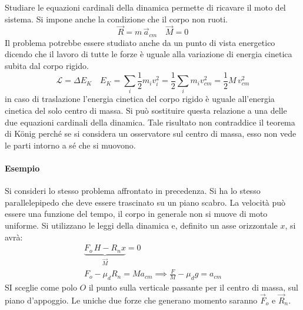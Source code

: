 \documentclass[10pt,a4paper]{book}
\begin{document}
\begin{figure}[htpb]
\end{figure}
\FloatBarrier
Studiare le equazioni cardinali della dinamica permette di ricavare il moto del sistema. Si impone anche la condizione che il corpo non ruoti.
\[
	\vec{R} = m\,\vec{a}_{cm} 	\quad \vec{M} = 0
\]
Il problema potrebbe essere studiato anche da un punto di vista energetico dicendo che il lavoro di tutte le forze è uguale alla variazione di energia cinetica subita dal corpo rigido.
\[
	\mathcal{L} = \Delta E_K \quad E_K = \sum_i \frac{1}{2}  m_i v_i^2  = \frac{1}{2} \sum_i m_i v_{cm}^2  = \frac{1}{2} M\,v_{cm}^2
\]
in caso di traslazione l'energia cinetica del corpo rigido è uguale all'energia cinetica del solo centro di massa. Si può sostituire questa relazione a una delle due equazioni cardinali della dinamica. Tale risultato non contraddice il teorema di K\"onig perché se si considera un osservatore sul centro di massa, esso non vede le parti intorno a sé che si muovono.

\paragraph{Esempio} Si consideri lo stesso problema affrontato in precedenza. Si ha lo stesso parallelepipedo che deve essere trascinato su un piano scabro. La velocità può essere una funzione del tempo, il corpo in generale non si muove di moto uniforme. Si utilizzano le leggi della dinamica e, definito un asse orizzontale $x$, si avrà:
\begin{gather*}
	\underbrace{F_o\,H - R_n x}_{\vec{M}} = 0 \\
	F_o - \mu_d R_n = Ma_{cm} \implies \frac{F}{M} - \mu_d g = a_{cm}
\end{gather*}
SI sceglie come polo $O$ il punto sulla verticale passante per il centro di massa, sul piano d'appoggio. Le uniche due forze che generano momento saranno $\vec{F}_o$ e $\vec{R}_n$.
\end{document}
